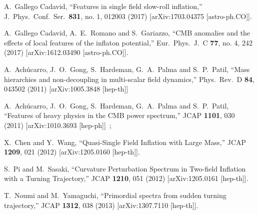 \documentclass[12pt]{article}
\begin{document}
\begin{thebibliography}{99}
  A.~Gallego Cadavid,
  ``Features in single field slow-roll inflation,''
  J.\ Phys.\ Conf.\ Ser.\  {\bf 831}, no. 1, 012003 (2017)
  [arXiv:1703.04375 [astro-ph.CO]].

  
  A.~Gallego Cadavid, A.~E.~Romano and S.~Gariazzo,
  ``CMB anomalies and the effects of local features of the inflaton potential,''
  Eur.\ Phys.\ J.\ C {\bf 77}, no. 4, 242 (2017)
  [arXiv:1612.03490 [astro-ph.CO]].
  



 
  A.~Ach\'ucarro, J.~O.~Gong, S.~Hardeman, G.~A.~Palma and S.~P.~Patil,
  ``Mass hierarchies and non-decoupling in multi-scalar field dynamics,''
  Phys.\ Rev.\ D {\bf 84}, 043502 (2011)
  [arXiv:1005.3848 [hep-th]]

  A.~Ach\'ucarro, J.~O.~Gong, S.~Hardeman, G.~A.~Palma and S.~P.~Patil,
  ``Features of heavy physics in the CMB power spectrum,''
  JCAP {\bf 1101}, 030 (2011)
  [arXiv:1010.3693 [hep-ph]]~;
  
  
  X.~Chen and Y.~Wang,
  ``Quasi-Single Field Inflation with Large Mass,''
  JCAP {\bf 1209}, 021 (2012)
  [arXiv:1205.0160 [hep-th]].
  
  
  S.~Pi and M.~Sasaki,
  ``Curvature Perturbation Spectrum in Two-field Inflation with a Turning Trajectory,''
  JCAP {\bf 1210}, 051 (2012)
  [arXiv:1205.0161 [hep-th]].
  
  T.~Noumi and M.~Yamaguchi,
  ``Primordial spectra from sudden turning trajectory,''
  JCAP {\bf 1312}, 038 (2013)
  [arXiv:1307.7110 [hep-th]].
  

\end{thebibliography}
\end{document}
